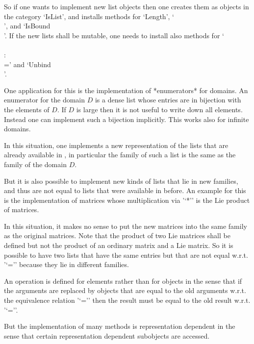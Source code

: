 So if one wants to implement new list objects then one creates them
as objects in the category `IsList', and installs methods for `Length',
`\\[\\]', and `IsBound\\[\\]'.
If the new lists shall be mutable, one needs to install also methods
for `\\[\\]\\:\\=' and `Unbind\\[\\]'.

One application for this is the implementation of *enumerators*
for domains.
An enumerator for the domain $D$ is a dense list whose entries are
in bijection with the elements of $D$.
If $D$ is large then it is not useful to write down all elements.
Instead one can implement such a bijection implicitly.
This works also for infinite domains.

In this situation, one implements a new representation of the
lists that are already available in {\GAP},
in particular the family of such a list is the same as the family of
the domain $D$.

But it is also possible to implement new kinds of lists that lie in
new families, and thus are not equal to lists that were available
in {\GAP} before.
An example for this is the implementation of matrices
whose multiplication via '`*'' is the Lie product of matrices.

In this situation, it makes no sense to put the new matrices into the
same family as the original matrices.
Note that the product of two Lie matrices shall be defined but not the
product of an ordinary matrix and a Lie matrix.
So it is possible to have two lists that have the same entries but that
are not equal w.r.t. '`='' because they lie in different families.



An operation is defined for elements rather than for objects in the sense
that if the arguments are replaced by objects that are equal to the old
arguments w.r.t. the equivalence relation '`='' then the result must be
equal to the old result w.r.t. '`=''.

But the implementation of many methods is representation dependent in the
sense that certain representation dependent subobjects are accessed.

